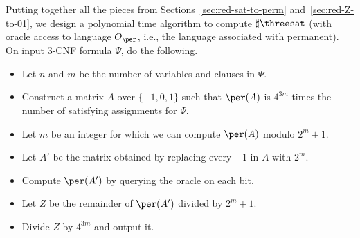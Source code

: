\documentclass[11pt, a4paper]{article}
\begin{document}
Putting together all the pieces from Sections~\ref{sec:red-sat-to-perm} and~\ref{sec:red-Z-to-01},
we design a polynomial time algorithm to compute $\sharp\threesat$
(with oracle access to language $O_{\per}$, i.e., the language associated with permanent).
On input 3-CNF formula $\Psi$, do the following.
\begin{itemize}
\item
Let $n$ and $m$ be the number of variables and clauses in $\Psi$.
\item
Construct a matrix $A$ over $\{-1,0,1\}$ such that $\per(A)$ is $4^{3m}$ times the number of satisfying assignments for $\Psi$.
\item
Let $m$ be an integer for which we can compute $\per(A)$ modulo $2^m+1$.
\item
Let $A'$ be the matrix obtained by replacing every $-1$ in $A$ with $2^m$. 
\item
Compute $\per(A')$ by querying the oracle on each bit.
\item
Let $Z$ be the remainder of $\per(A')$ divided by $2^m+1$.
\item
Divide $Z$ by $4^{3m}$ and output it.
\end{itemize}
\end{document}

